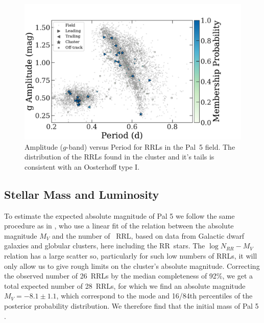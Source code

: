 \documentclass[twocolumn]{aastex63}
\begin{document}
\begin{figure}[t]
\begin{center}
\includegraphics[width=\textwidth]{rrls_PA.pdf}
\caption{Amplitude ($g$-band) versus Period for RRLs in the Pal~5 field. The distribution of the RRLs found in the cluster and it's tails is consistent with an Oosterhoff type I. }
\label{fig:PA_diagram}
\end{center}
\end{figure}

\subsection{Stellar Mass and Luminosity}



To estimate the expected absolute magnitude of Pal 5 we follow the same procedure as in \citet{Mateu:2018}, who use a linear fit of the relation between the absolute magnitude $M_V$ and the number of \typeab\ RRL, based on data from Galactic dwarf galaxies and globular clusters, here including the RR\typec~stars.  The $\log{N_{RR}}-M_V$ relation has a large scatter so, particularly for such low numbers of RRLs, it will only allow us to give rough limits on the cluster's absolute magnitude. Correcting the observed number of 26~RRLs by the median completeness of 92\%, we get a total expected number of 28~RRLs, for which we find an absolute magnitude $M_V=-8.1\pm 1.1$, which correspond to the mode and 16/84th percentiles of the posterior probability distribution.
We therefore find that the initial mass of Pal 5 .
\end{document}

